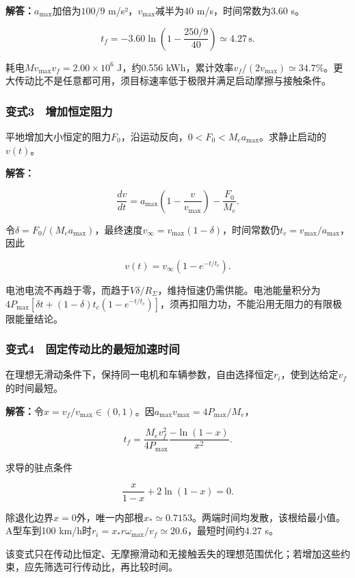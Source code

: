 \documentclass[12pt,a4paper,fontset=fandol]{ctexart}
\begin{document}
\textbf{解答：}\(a_{\max}\)加倍为\(100/9\) m/s²，\(v_{\max}\)减半为40
m/s，时间常数为3.60 s。

\[
t_f=-3.60\ln\left(1-\frac{250/9}{40}\right)
\simeq4.27\,\mathrm s.
\]

耗电\(M v_{\max}v_f=2.00\times10^6\) J，约0.556
kWh，累计效率\(v_f/(2v_{\max})\simeq34.7\%\)。更大传动比不是任意都可用，须目标速率低于极限并满足启动摩擦与接触条件。

\subsubsection{变式3　增加恒定阻力}\label{ux53d8ux5f0f3-ux589eux52a0ux6052ux5b9aux963bux529b}

平地增加大小恒定的阻力\(F_0\)，沿运动反向，\(0<F_0<M_ea_{\max}\)。求静止启动的\(v(t)\)。

\textbf{解答：}

\[
\frac{dv}{dt}=a_{\max}\left(1-\frac v{v_{\max}}\right)
-\frac{F_0}{M_e}.
\]

令\(\delta=F_0/(M_ea_{\max})\)，最终速度\(v_\infty=v_{\max}(1-\delta)\)，时间常数仍\(t_c=v_{\max}/a_{\max}\)，因此

\[
v(t)=v_\infty(1-e^{-t/t_c}).
\]

电池电流不再趋于零，而趋于\(V\delta/R_\Sigma\)，维持恒速仍需供能。电池能量积分为\(4P_{\max}[\delta t+(1-\delta)t_c(1-e^{-t/t_c})]\)，须再扣阻力功，不能沿用无阻力的有限极限能量结论。

\subsubsection{变式4　固定传动比的最短加速时间}\label{ux53d8ux5f0f4-ux56faux5b9aux4f20ux52a8ux6bd4ux7684ux6700ux77edux52a0ux901fux65f6ux95f4}

在理想无滑动条件下，保持同一电机和车辆参数，自由选择恒定\(r_i\)，使到达给定\(v_f\)的时间最短。

\textbf{解答：}令\(x=v_f/v_{\max}\in(0,1)\)。因\(a_{\max}v_{\max}=4P_{\max}/M_e\)，

\[
t_f=\frac{M_ev_f^2}{4P_{\max}}
\frac{-\ln(1-x)}{x^2}.
\]

求导的驻点条件

\[
\frac{x}{1-x}+2\ln(1-x)=0.
\]

除退化边界\(x=0\)外，唯一内部根\(x_*\simeq0.7153\)。两端时间均发散，该根给最小值。A型车到100
km/h时\(r_i=x_*r\omega_{\max}/v_f\simeq20.6\)，最短时间约4.27 s。

该变式只在传动比恒定、无摩擦滑动和无接触丢失的理想范围优化；若增加这些约束，应先筛选可行传动比，再比较时间。
\end{document}
